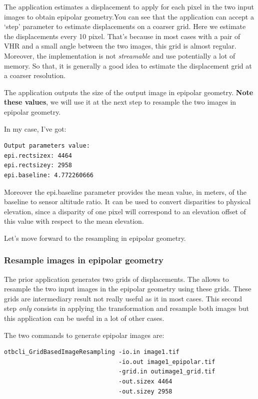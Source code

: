 The application estimates a displacement to apply for each pixel in the two
input images to obtain epipolar geometry.You can see that the application can
accept a `step' parameter to estimate displacements on a coarser grid. Here we
estimate the displacements every 10 pixel. That's because in most cases with a
pair of VHR and a small angle between the two images, this grid is almost
regular.  Moreover, the implementation is not \textit{streamable} and use potentially a
lot of memory. So that, it is generally a good idea to estimate the displacement
grid at a coarser resolution.

The application outputs the size of the output image in epipolar
geometry. \textbf{Note these values}, we will use it at the next step to
resample the two images in epipolar geometry.

In my case, I've got:

\begin{verbatim}
Output parameters value:
epi.rectsizex: 4464
epi.rectsizey: 2958
epi.baseline: 4.772260666
\end{verbatim}

Moreover the epi.baseline parameter provides the mean value, in meters, of the
baseline to sensor altitude ratio. It can be used to convert disparities to
physical elevation, since a disparity of one pixel will correspond to an
elevation offset of this value with respect to the mean elevation.

Let's move forward to the resampling in epipolar geometry.

\subsubsection{Resample images in epipolar geometry}

The prior application generates two grids of displacements. The
 allows to resample the two input images
in the epipolar geometry using these grids.  These grids are intermediary result
not really useful as it in most cases. This second step \textit{only} consists in
applying the transformation and resample both images but this application can be
useful in a lot of other cases.

The two commands to generate epipolar images are:
\begin{verbatim}
otbcli_GridBasedImageResampling -io.in image1.tif
                                -io.out image1_epipolar.tif
                                -grid.in outimage1_grid.tif
                                -out.sizex 4464
                                -out.sizey 2958
\end{verbatim}

